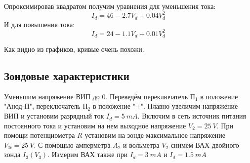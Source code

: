 \documentclass{article}
\begin{document}
Опроксимировав квадратом получим уравнения для уменьшения тока:
\[ I_d = 46 - 2.7V_d + 0.04V_d^2 \]
И для повышения тока:
\[ I_d = 24 - 1.1V_d + 0.01V_d^2 \]

Как видно из графиков, кривые очень похожи.

\subsection{Зондовые характеристики}
Уменьшим напряжение ВИП до 0. Переведём переключатель \(\text{П}_1\) в положение "Анод-II",
переключатель \(\text{П}_2\) в положение "+".
Плавно увеличим напряжение ВИП и установим разрядный ток \(I_d = 5\:mA\). Включим в сеть источник
питания постоянного тока и установим на нем выходное напряжение \(V_2 = 25\:V\). При помощи
потенциометра \(R\) установим на зонде максимальное напряжение \(V_@ = 25\:V\).
С помощью амперметра \(A_2\) и вольметра \(V_2\) снимем ВАХ двойного зонда \(I_3\left(V_3\right)\).
Измерим ВАХ также при \(I_d = 3\: mA\) и \(I_d = 1.5\: mA\)
\end{document}
